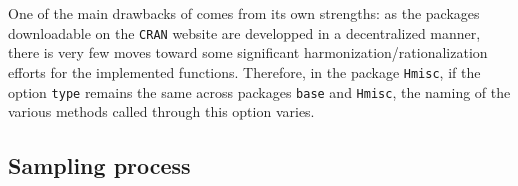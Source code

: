 \noindent One of the main drawbacks of \R comes from its own strengths: as the packages downloadable on the \texttt{CRAN} website are developped in a decentralized manner, there is very few moves toward some significant harmonization/rationalization efforts for the implemented functions. Therefore, in the package \texttt{Hmisc}, if the option \texttt{type} remains the same across packages \texttt{base} and \texttt{Hmisc}, the naming of the various methods called through this option varies. 

\subsection{Sampling process}
